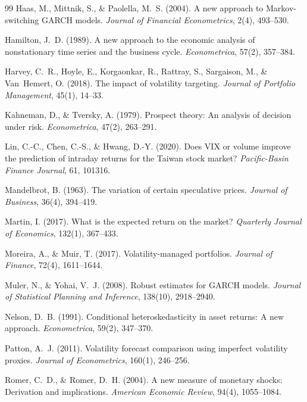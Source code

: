 \documentclass[12pt,a4paper]{article}
\begin{document}
\begin{thebibliography}{99}
Haas, M., Mittnik, S., \& Paolella, M.~S. (2004). A new approach to Markov-switching GARCH models. \textit{Journal of Financial Econometrics}, 2(4), 493--530.

Hamilton, J.~D. (1989). A new approach to the economic analysis of nonstationary time series and the business cycle. \textit{Econometrica}, 57(2), 357--384.

Harvey, C.~R., Hoyle, E., Korgaonkar, R., Rattray, S., Sargaison, M., \& Van~Hemert, O. (2018). The impact of volatility targeting. \textit{Journal of Portfolio Management}, 45(1), 14--33.

Kahneman, D., \& Tversky, A. (1979). Prospect theory: An analysis of decision under risk. \textit{Econometrica}, 47(2), 263--291.

Lin, C.-C., Chen, C.-S., \& Hwang, D.-Y. (2020). Does VIX or volume improve the prediction of intraday returns for the Taiwan stock market? \textit{Pacific-Basin Finance Journal}, 61, 101316.

Mandelbrot, B. (1963). The variation of certain speculative prices. \textit{Journal of Business}, 36(4), 394--419.

Martin, I. (2017). What is the expected return on the market? \textit{Quarterly Journal of Economics}, 132(1), 367--433.

Moreira, A., \& Muir, T. (2017). Volatility-managed portfolios. \textit{Journal of Finance}, 72(4), 1611--1644.

Muler, N., \& Yohai, V.~J. (2008). Robust estimates for GARCH models. \textit{Journal of Statistical Planning and Inference}, 138(10), 2918--2940.

Nelson, D.~B. (1991). Conditional heteroskedasticity in asset returns: A new approach. \textit{Econometrica}, 59(2), 347--370.

Patton, A.~J. (2011). Volatility forecast comparison using imperfect volatility proxies. \textit{Journal of Econometrics}, 160(1), 246--256.

Romer, C.~D., \& Romer, D.~H. (2004). A new measure of monetary shocks: Derivation and implications. \textit{American Economic Review}, 94(4), 1055--1084.


\end{thebibliography}
\end{document}

